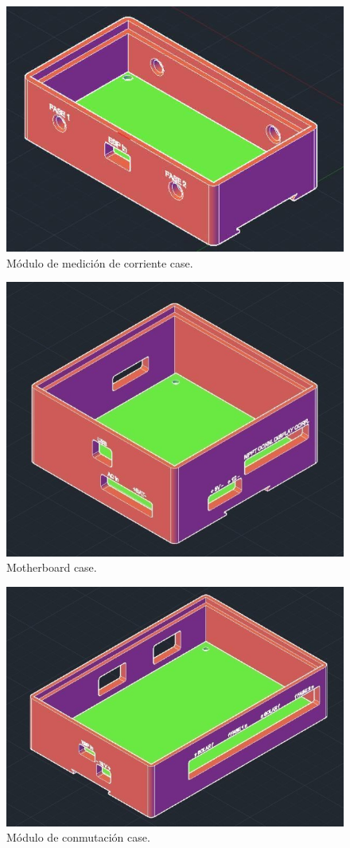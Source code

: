 \begin{figure}[H]
    \centering
    \includegraphics[width=0.75\linewidth]{informes/Screenshot_21.jpg}
    \caption{Módulo de medición de corriente case.}
    
\end{figure}

\begin{figure}[H]
    \centering
    \includegraphics[width=0.75\linewidth]{informes/Screenshot_23.jpg}
    \caption{Motherboard case.}
    
\end{figure}

\begin{figure}[H]
    \centering
    \includegraphics[width=0.75\linewidth]{informes/Screenshot_22.jpg}
    \caption{Módulo de conmutación case.}
\end{figure}

